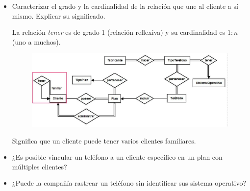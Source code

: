 \documentclass[letterpaper,11pt]{article}
\begin{document}
\begin{itemize}
    \item Caracterizar el grado y la cardinalidad de la relación que une al 
    cliente a sí mismo. Explicar su significado.

    La relación \textit{tener} es de grado 1 (relación reflexiva) y su 
    cardinalidad es $1:n$ (uno a muchos). 

    \begin{figure}[H]
        \centering
        \includegraphics[scale=0.4]{./imagenes/modelo11.jpg}
    \end{figure}

    Significa que un cliente puede tener varios clientes familiares.
    \item ¿Es posible vincular un teléfono a un cliente específico en un plan 
    con múltiples clientes?

    \item ¿Puede la compañía rastrear un teléfono sin identificar sus sistema 
    operativo?

\end{itemize}
\end{document}
